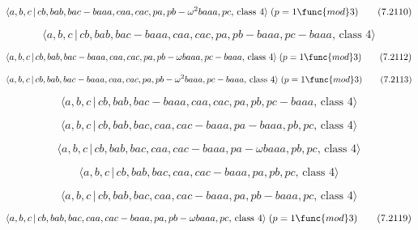 \documentclass[10pt]{article}
\begin{document}
\begin{equation}
\langle a,b,c\,|\,cb,bab,bac-baaa,caa,cac,pa,pb-\omega ^{2}baaa,pc,\,\text{%
class }4\rangle \;(p=1\func{mod}3)  \tag{7.2110}
\end{equation}

\begin{equation}
\langle a,b,c\,|\,cb,bab,bac-baaa,caa,cac,pa,pb-baaa,pc-baaa,\,\text{class }%
4\rangle  \tag{7.2111}
\end{equation}

\begin{equation}
\langle a,b,c\,|\,cb,bab,bac-baaa,caa,cac,pa,pb-\omega baaa,pc-baaa,\,\text{%
class }4\rangle \;(p=1\func{mod}3)  \tag{7.2112}
\end{equation}

\begin{equation}
\langle a,b,c\,|\,cb,bab,bac-baaa,caa,cac,pa,pb-\omega ^{2}baaa,pc-baaa,\,%
\text{class }4\rangle \;(p=1\func{mod}3)  \tag{7.2113}
\end{equation}

\begin{equation}
\langle a,b,c\,|\,cb,bab,bac-baaa,caa,cac,pa,pb,pc-baaa,\,\text{class }%
4\rangle  \tag{7.2114}
\end{equation}

\begin{equation}
\langle a,b,c\,|\,cb,bab,bac,caa,cac-baaa,pa-baaa,pb,pc,\,\text{class }%
4\rangle  \tag{7.2115}
\end{equation}

\begin{equation}
\langle a,b,c\,|\,cb,bab,bac,caa,cac-baaa,pa-\omega baaa,pb,pc,\,\text{class 
}4\rangle  \tag{7.2116}
\end{equation}

\begin{equation}
\langle a,b,c\,|\,cb,bab,bac,caa,cac-baaa,pa,pb,pc,\,\text{class }4\rangle 
\tag{7.2117}
\end{equation}

\begin{equation}
\langle a,b,c\,|\,cb,bab,bac,caa,cac-baaa,pa,pb-baaa,pc,\,\text{class }%
4\rangle  \tag{7.2118}
\end{equation}

\begin{equation}
\langle a,b,c\,|\,cb,bab,bac,caa,cac-baaa,pa,pb-\omega baaa,pc,\,\text{class 
}4\rangle \;(p=1\func{mod}3)  \tag{7.2119}
\end{equation}
\end{document}
